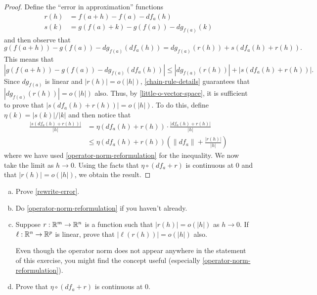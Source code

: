 \begin{proof}
	Define the ``error in approximation'' functions
	\[ \begin{aligned} 
	r(h) &= f(a+h)-f(a) - df_a(h) \\ 
	s(k) &= g(f(a)+k)-g(f(a))-dg_{f(a)}(k) 
	\end{aligned} \]
	and then observe that
	\begin{equation} \label{rewrite-error} g(f(a+h)) - g(f(a)) - dg_{f(a)}(df_a(h)) = dg_{f(a)}(r(h)) + s(df_a(h)+r(h)). \end{equation}
	This means that 
	\[ |g(f(a+h)) - g(f(a)) - dg_{f(a)}(df_a(h))| \leq |dg_{f(a)}(r(h))| + |s(df_a(h)+r(h))|. \]
	Since $dg_{f(a)}$ is linear and $|r(h)| = o(|h|)$, \cref{chain-rule-details} guarantees that $|dg_{f(a)}(r(h))| = o(|h|)$ also. Thus, by \cref{little-o-vector-space}, it is sufficient to prove that $|s(df_a(h) + r(h))| = o(|h|)$. To do this, define $\eta(k) = |s(k)|/|k|$ and then notice that 
	\[ \begin{aligned} \frac{|s(df_a(h)+r(h))|}{|h|} &= \eta(df_a(h)+r(h)) \cdot \frac{|df_a(h) + r(h)|}{|h|} \\
	&\leq \eta(df_a(h) + r(h)) \left( \|df_a\| + \frac{|r(h)|}{|h|} \right) \end{aligned} \]
	where we have used \cref{operator-norm-reformulation} for the inequality.
	We now take the limit as $h \to 0$. Using the facts that $\eta \circ (df_a + r)$ is continuous at 0 and that $|r(h)| = o(|h|)$, we obtain the result. 
\end{proof}

\begin{exercise} \label{chain-rule-details}
	\begin{enumerate}[(a)]
		\item Prove \cref{rewrite-error}. 
		
		\item Do \cref{operator-norm-reformulation} if you haven't already. 
		
		\item \label{linear-of-small-is-small} Suppose $r : \mathbb{R}^m \to \mathbb{R}^n$ is a function such that $|r(h)| = o(|h|)$ as $h \to 0$. If $\ell : \mathbb{R}^n \to \mathbb{R}^p$ is linear, prove that $|\ell(r(h))| = o(|h|)$ also.
		
		\begin{hint} Even though the operator norm does not appear anywhere in the statement of this exercise, you might find the concept useful (especially \cref{operator-norm-reformulation}). 
		\end{hint}
		
		\item Prove that $\eta \circ (df_a + r)$ is continuous at 0. 
	\end{enumerate}
\end{exercise}

